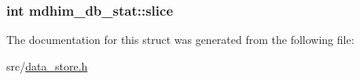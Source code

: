 \hypertarget{structmdhim__db__stat_af69e251abcde91c5441f7a55c408ab55}{
\subsubsection[{slice}]{\setlength{\rightskip}{0pt plus 5cm}int mdhim\-\_\-db\-\_\-stat\-::slice}}\label{structmdhim__db__stat_af69e251abcde91c5441f7a55c408ab55}


The documentation for this struct was generated from the following file\-:\begin{DoxyCompactItemize}
\item 
src/\hyperlink{data__store_8h}{data\-\_\-store.\-h}\end{DoxyCompactItemize}
